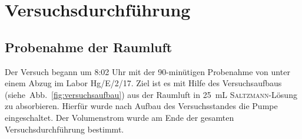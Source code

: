 \section{Versuchsdurchführung}
\label{sec:durchfuerung}

\subsection*{Probenahme der Raumluft}
Der Versuch begann um 8:02 Uhr mit der 90-minütigen Probenahme von  unter einem Abzug im Labor Hg/E/2/17. 
Ziel ist es mit Hilfe des Versuchsaufbaus \mbox{(siehe Abb. \ref{fig:versuchsaufbau})}  aus der Raumluft in \SI{25}{\milli \liter} \textsc{Saltzmann}-Lösung zu absorbieren.
Hierfür wurde nach Aufbau des Versuchsstandes die Pumpe eingeschaltet. Der Volumenstrom wurde am Ende der gesamten Versuchsdurchführung bestimmt.


